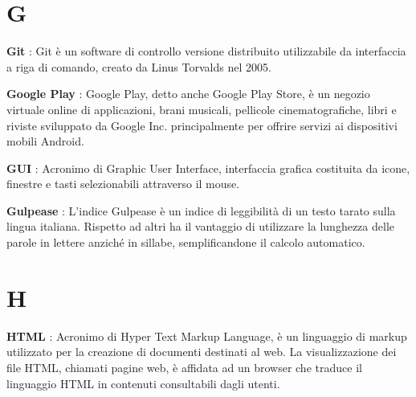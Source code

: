 \documentclass[12pt,a4paper,titlepage]{article}
\begin{document}
\section{G}
\begin{trivlist}
\item \textbf{Git} : Git è un software di controllo versione distribuito utilizzabile da interfaccia a riga di comando, creato da Linus Torvalds nel 2005.
\item \textbf{Google Play} : Google Play, detto anche Google Play Store, è un negozio virtuale online di applicazioni, brani musicali, pellicole cinematografiche, libri e riviste sviluppato da Google Inc. principalmente per offrire servizi ai dispositivi mobili Android.
\item \textbf{GUI} : Acronimo di Graphic User Interface, interfaccia grafica costituita da icone, finestre e tasti selezionabili attraverso il mouse.
\item \textbf{Gulpease} : L'indice Gulpease è un indice di leggibilità di un testo tarato sulla lingua italiana. Rispetto ad altri ha il vantaggio di utilizzare la lunghezza delle parole in lettere anziché in sillabe, semplificandone il calcolo automatico.
\end{trivlist}


\section{H}
\begin{trivlist}
	\item \textbf{HTML} : Acronimo di Hyper Text Markup Language, è un linguaggio di markup utilizzato per la creazione di documenti destinati al web. La visualizzazione dei file HTML, chiamati pagine web, è affidata ad un browser che traduce il linguaggio HTML in contenuti consultabili dagli utenti.
\end{trivlist}

\end{document}
